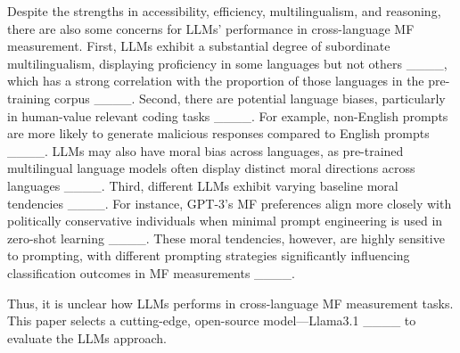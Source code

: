 Despite the strengths in accessibility, efficiency, multilingualism, and reasoning, there are also some concerns for LLMs' performance in cross-language MF measurement. First, LLMs exhibit a substantial degree of subordinate multilingualism, displaying proficiency in some languages but not others ____, which has a strong correlation with the proportion of those languages in the pre-training corpus ____. Second, there are potential language biases, particularly in human-value relevant coding tasks ____. For example, non-English prompts are more likely to generate malicious responses compared to English prompts ____. LLMs may also have moral bias across languages, as pre-trained multilingual language models often display distinct moral directions across languages ____. %
Third, different LLMs exhibit varying baseline moral tendencies ____. For instance, GPT-3’s MF preferences align more closely with politically conservative individuals when minimal prompt engineering is used in zero-shot learning ____. These moral tendencies, however, are highly sensitive to prompting, with different prompting strategies significantly influencing classification outcomes in MF measurements ____.

Thus, it is unclear how LLMs performs in cross-language MF measurement tasks. This paper selects a cutting-edge, open-source model---Llama3.1 ____ to evaluate the LLMs approach.